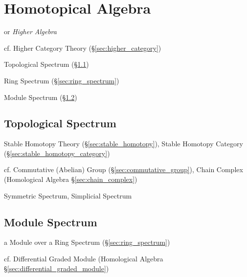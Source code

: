 \section{Homotopical Algebra}\label{sec:homotopical_algebra}

or \emph{Higher Algebra}

cf. Higher Category Theory (\S\ref{sec:higher_category})

Topological Spectrum (\S\ref{sec:topological_spectrum})

Ring Spectrum (\S\ref{sec:ring_spectrum})

Module Spectrum (\S\ref{sec:module_spectrum})



\subsection{Topological Spectrum}\label{sec:topological_spectrum}


Stable Homotopy Theory (\S\ref{sec:stable_homotopy}), Stable Homotopy Category
(\S\ref{sec:stable_homotopy_category})

cf. Commutative (Abelian) Group (\S\ref{sec:commutative_group}), Chain Complex
(Homological Algebra \S\ref{sec:chain_complex})

Symmetric Spectrum, Simplicial Spectrum



\subsection{Module Spectrum}\label{sec:module_spectrum}

a Module over a Ring Spectrum (\S\ref{sec:ring_spectrum})

cf. Differential Graded Module (Homological Algebra
\S\ref{sec:differential_graded_module})



